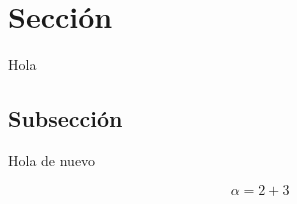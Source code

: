 
\section{Sección}

Hola

\subsection{Subsección}

Hola de nuevo

\begin{equation}
    \alpha = 2 + 3
\end{equation}